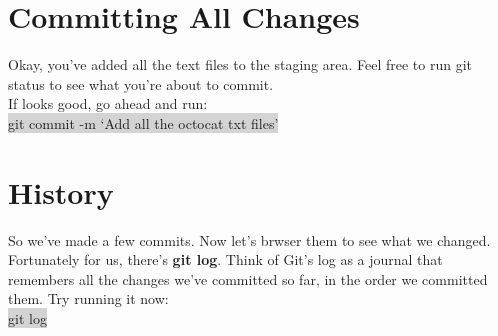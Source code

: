 \documentclass{article}
\begin{document}
\section{Committing All Changes}
\begin{minipage}[c]{0.66\textwidth}
	\parbox{\textwidth}{
		Okay, you've added all the text files to the staging area. Feel free to run git status to see what you're about to commit.\\
		If looks good, go ahead and run:\\
		\colorbox{lightgray}{ git commit -m `Add all the octocat txt files' }\\
	}
\end{minipage}
\hfill
\begin{minipage}[c]{0.32\textwidth}
\end{minipage}

\section{History}
\begin{minipage}[c]{0.66\textwidth}
	\parbox{\textwidth}{
		So we've made a few commits. Now let's brwser them to see what we changed.\\
		Fortunately for us, there's \textbf{git log}. Think of Git's log as a journal that remembers all the changes we've committed so far, in the order we committed them. Try running it now:\\
		\colorbox{lightgray}{ git log}
	}
\end{minipage}
\hfill
\begin{minipage}[c]{0.32\textwidth}
\end{minipage}
\end{document}
